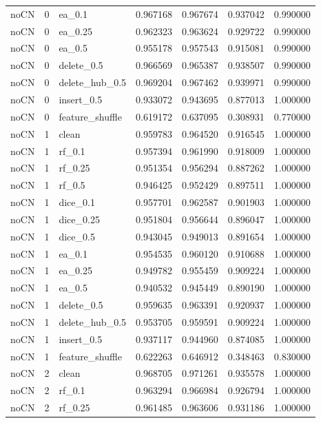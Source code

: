 \documentclass[UTF8,a4paper,11pt,fontset=fandol]{ctexart}
\begin{document}
{\begin{longtable}{lrlrrrr}
noCN & 0 & ea\_0.1 & 0.967168 & 0.967674 & 0.937042 & 0.990000 \\
noCN & 0 & ea\_0.25 & 0.962323 & 0.963624 & 0.929722 & 0.990000 \\
noCN & 0 & ea\_0.5 & 0.955178 & 0.957543 & 0.915081 & 0.990000 \\
noCN & 0 & delete\_0.5 & 0.966569 & 0.965387 & 0.938507 & 0.990000 \\
noCN & 0 & delete\_hub\_0.5 & 0.969204 & 0.967462 & 0.939971 & 0.990000 \\
noCN & 0 & insert\_0.5 & 0.933072 & 0.943695 & 0.877013 & 1.000000 \\
noCN & 0 & feature\_shuffle & 0.619172 & 0.637095 & 0.308931 & 0.770000 \\
noCN & 1 & clean & 0.959783 & 0.964520 & 0.916545 & 1.000000 \\
noCN & 1 & rf\_0.1 & 0.957394 & 0.961990 & 0.918009 & 1.000000 \\
noCN & 1 & rf\_0.25 & 0.951354 & 0.956294 & 0.887262 & 1.000000 \\
noCN & 1 & rf\_0.5 & 0.946425 & 0.952429 & 0.897511 & 1.000000 \\
noCN & 1 & dice\_0.1 & 0.957701 & 0.962587 & 0.901903 & 1.000000 \\
noCN & 1 & dice\_0.25 & 0.951804 & 0.956644 & 0.896047 & 1.000000 \\
noCN & 1 & dice\_0.5 & 0.943045 & 0.949013 & 0.891654 & 1.000000 \\
noCN & 1 & ea\_0.1 & 0.954535 & 0.960120 & 0.910688 & 1.000000 \\
noCN & 1 & ea\_0.25 & 0.949782 & 0.955459 & 0.909224 & 1.000000 \\
noCN & 1 & ea\_0.5 & 0.940532 & 0.945449 & 0.890190 & 1.000000 \\
noCN & 1 & delete\_0.5 & 0.959635 & 0.963391 & 0.920937 & 1.000000 \\
noCN & 1 & delete\_hub\_0.5 & 0.953705 & 0.959591 & 0.909224 & 1.000000 \\
noCN & 1 & insert\_0.5 & 0.937117 & 0.944960 & 0.874085 & 1.000000 \\
noCN & 1 & feature\_shuffle & 0.622263 & 0.646912 & 0.348463 & 0.830000 \\
noCN & 2 & clean & 0.968705 & 0.971261 & 0.935578 & 1.000000 \\
noCN & 2 & rf\_0.1 & 0.963294 & 0.966984 & 0.926794 & 1.000000 \\
noCN & 2 & rf\_0.25 & 0.961485 & 0.963606 & 0.931186 & 1.000000 \\

\end{longtable}}
\end{document}
